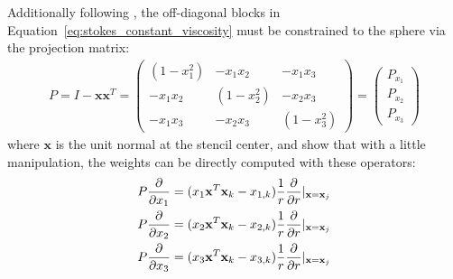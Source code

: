 Additionally following \cite{FlyerWright09, FlyerLehto11}, the off-diagonal blocks in Equation~\ref{eq:stokes_constant_viscosity} must be constrained to the sphere via the projection matrix: 
\begin{align}
P = I - \mathbf{x} \mathbf{x}^T =  \begin{pmatrix} 
(1-x_1^2) & -x_1 x_2 & -x_1 x_3 \\
-x_1 x_2 & (1-x_2^2) & -x_2 x_3 \\ 
-x_1 x_3 & -x_2 x_3 & (1-x_3^2) 
\end{pmatrix} = \begin{pmatrix} P_{x_1} \\ P_{x_2} \\ P_{x_3} \end{pmatrix}
\label{eq:gradient_projection}
\end{align}
where $\mathbf{x}$ is the unit normal at the stencil center, and 
%
%
\cite{FlyerWright09, FlyerLehto11} show that with a little manipulation, the weights can be directly computed with these operators: 
\begin{align*} 
P\frac{\partial }{\partial x_1} = ( x_1 \mathbf{x}^T \mathbf{x}_k - x_{1,k}) \frac{1}{r} \frac{\partial }{\partial r} |_{\mathbf{x}=\mathbf{x}_j} \\
P\frac{\partial }{\partial x_2} = ( x_2 \mathbf{x}^T \mathbf{x}_k - x_{2,k}) \frac{1}{r} \frac{\partial }{\partial r} |_{\mathbf{x}=\mathbf{x}_j} \\
P\frac{\partial }{\partial x_3} = ( x_3 \mathbf{x}^T \mathbf{x}_k - x_{3,k}) \frac{1}{r} \frac{\partial }{\partial r} |_{\mathbf{x}=\mathbf{x}_j}
\end{align*}


